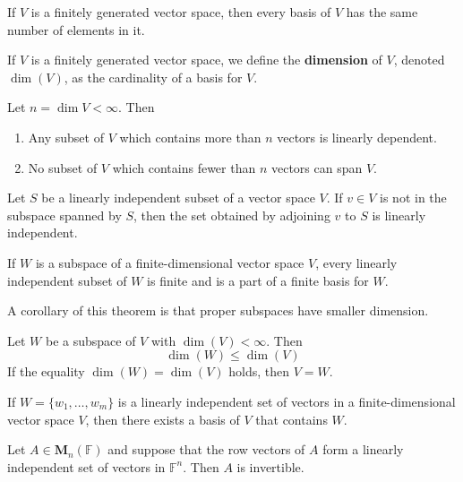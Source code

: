 \begin{theorem}
	If $V$ is a finitely generated vector space, then every basis of $V$ has the same number of elements in it.
\end{theorem}

\begin{definition}[Dimension]
	If $V$ is a finitely generated vector space, we define the \textbf{dimension} of $V$, denoted $\dim(V)$, as the cardinality of a basis for $V$.
\end{definition}

\begin{corollary}
	Let $n = \dim V < \infty$. Then
	\begin{enumerate}
		\item Any subset of $V$ which contains more than $n$ vectors is linearly dependent.
		\item No subset of $V$ which contains fewer than $n$ vectors can span $V$.
	\end{enumerate}
\end{corollary}

\begin{lemma}
	Let $S$ be a linearly independent subset of a vector space $V$. If $v \in V$ is not in the subspace spanned by $S$, then the set obtained by adjoining $v$ to $S$ is linearly independent.
\end{lemma}

\begin{theorem}
	If $W$ is a subspace of a finite-dimensional vector space $V$, every linearly independent subset of $W$ is finite and is a part of a finite basis for $W$.
\end{theorem}

A corollary of this theorem is that proper subspaces have smaller dimension.

\begin{corollary}
	Let $W$ be a subspace of $V$ with $\dim(V) < \infty$. Then \[ \dim(W) \leq \dim(V) \] If the equality $\dim(W) = \dim(V)$ holds, then $V = W$.
\end{corollary}

\begin{corollary}
	If $W = \{ w_1, \ldots, w_m \}$ is a linearly independent set of vectors in a finite-dimensional vector space $V$, then there exists a basis of $V$ that contains $W$.
\end{corollary}

\begin{corollary}
	Let $A \in \textbf{M}_n(\mathbb{F})$ and suppose that the row vectors of $A$ form a linearly independent set of vectors in $\mathbb{F}^n$. Then $A$ is invertible.
\end{corollary}

